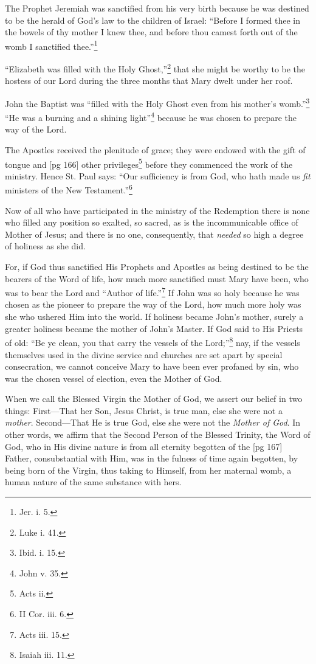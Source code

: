 The Prophet Jeremiah was sanctified from his
very birth because he was destined to be the herald
of God's law to the children of Israel: “Before
I formed thee in the bowels of thy mother I knew
thee, and before thou camest forth out of the
womb I sanctified thee.”\footnote{Jer. i. 5.}

“Elizabeth was filled with the Holy
Ghost,”\footnote{Luke i. 41.}
that she might be worthy to be the hostess of our
Lord during the three months that Mary dwelt
under her roof.

John the Baptist was “filled with the Holy
Ghost even from his mother's womb.”\footnote{Ibid.
i. 15.} “He was
a burning and a shining light”\footnote{John
v. 35.} because he was
chosen to prepare the way of the Lord.

The Apostles received the plenitude of grace;
they were endowed with the gift of tongue and
[pg 166]
other privileges\footnote{Acts
ii.} before they commenced the
work of the ministry. Hence St. Paul says: “Our
sufficiency is from God, who hath made us \emph{fit} ministers
of the New Testament.”\footnote{II Cor. iii. 6.}

Now of all who have participated in the ministry
of the Redemption there is none who filled
any position so exalted, so sacred, as is the incommunicable
office of Mother of Jesus; and there
is no one, consequently, that \emph{needed} so high a degree
of holiness as she did.

For, if God thus sanctified His Prophets and
Apostles as being destined to be the bearers of
the Word of life, how much more sanctified must
Mary have been, who was to bear the Lord and
“Author of life.”\footnote{Acts
iii. 15.} If John was so holy because
he was chosen as the pioneer to prepare the way
of the Lord, how much more holy was she who
ushered Him into the world. If holiness became
John's mother, surely a greater holiness became
the mother of John's Master. If God said to His
Priests of old: “Be ye clean, you that carry the
vessels of the Lord;”\footnote{Isaiah
iii. 11.} nay, if the vessels themselves
used in the divine service and churches are
set apart by special consecration, we cannot conceive
Mary to have been ever profaned by sin, who
was the chosen vessel of election, even the Mother
of God.

When we call the Blessed Virgin the Mother of
God, we assert our belief in two things: First—That
her Son, Jesus Christ, is true man, else she
were not a \emph{mother}. Second—That He is true God,
else she were not the \emph{Mother of God}. In other
words, we affirm that the Second Person of the
Blessed Trinity, the Word of God, who in His
divine nature is from all eternity begotten of the
[pg 167]
Father, consubstantial with Him, was in the fulness
of time again begotten, by being born of the
Virgin, thus taking to Himself, from her maternal
womb, a human nature of the same substance with
hers.

